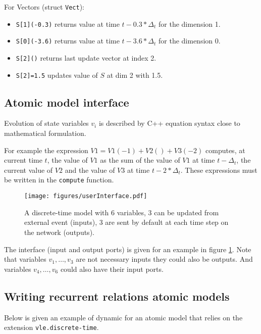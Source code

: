 \documentclass{article}
\theoremstyle{remark}
\begin{document}
For Vectors (struct \texttt{Vect}):
\begin{itemize}
  \item \texttt{S[1](-0.3)} returns value at time $t - 0.3 * \Delta_t$ for the
  dimension 1.
  \item \texttt{S[0](-3.6)} returns value at time $t - 3.6 * \Delta_t$
  for the dimension 0.
  \item \texttt{S[2]()} returns last update vector at index 2.
  \item \texttt{S[2]=1.5} updates value of $S$ at dim 2 with 1.5.
\end{itemize}

\subsection{Atomic model interface}
\label{sec:user:atomic}

Evolution of state variables $v_i$ is described by C++ equation syntax close to
mathematical formulation.

For example the expression $V1 = V1(-1) + V2() + V3(-2)$ computes, at current
time $t$, the value of $V1$ as the sum of the value of $V1$ at time 
$t - \Delta_t$, the current value of $V2$ and the value of $V3$ at time 
$t - 2*\Delta_t$. These expressions must be written in the
\texttt{compute} function.

\begin{figure}[!h]
\begin{center} 
\texttt{[image: figures/userInterface.pdf]}
\caption{\label{fig:userInt} A discrete-time model with 6 variables, 3 can be
updated from external event (inputs), 3 are sent by default at each time step 
on the network (outputs).}
\end{center}
\end{figure}

The interface (input and output ports) is given for an example in figure
\ref{fig:userInt}. Note that variables $v_1, \ldots, v_3$ are not necessary
inputs they could also be outputs. And variables $v_4, \ldots, v_6$ could also
have their input ports.

\subsection{Writing recurrent relations atomic models}
\label{sec:user:diff}

Below is given an example of dynamic for an atomic model that relies 
on the extension {\tt vle.discrete-time}.
\end{document}
